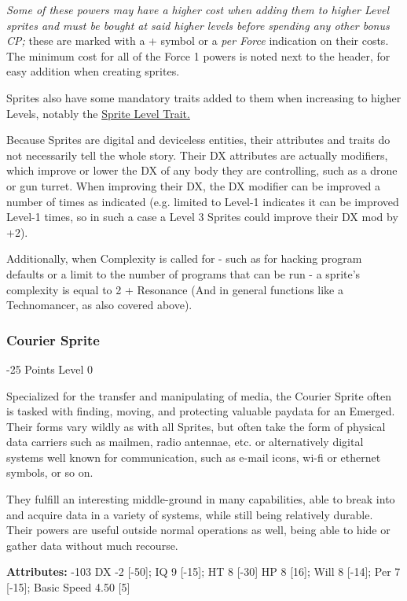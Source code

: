 \begin{multicols*}{3}
\textit{Some of these powers may have a higher cost when adding them to higher Level sprites and must be bought at said higher levels before spending any other bonus CP;} these are marked with a + symbol or a \textit{per Force} indication on their costs. The minimum cost for all of the Force 1 powers is noted next to the header, for easy addition when creating sprites.

Sprites also have some mandatory traits added to them when increasing to higher Levels, notably the \hyperref[sprite_level]{Sprite Level Trait.}

Because Sprites are digital and deviceless entities, their attributes and traits do not necessarily tell the whole story. Their DX attributes are actually modifiers, which improve or lower the DX of any body they are controlling, such as a drone or gun turret. When improving their DX, the DX modifier can be improved a number of times as indicated (e.g. limited to Level-1 indicates it can be improved Level-1 times, so in such a case a Level 3 Sprites could improve their DX mod by +2).

Additionally, when Complexity is called for - such as for hacking program defaults or a limit to the number of programs that can be run - a sprite's complexity is equal to 2 + Resonance (And in general functions like a Technomancer, as also covered above).

\subsubsection{Courier Sprite}
\begin{flushright}
	 -25 Points Level 0
\end{flushright}

Specialized for the transfer and manipulating of media, the Courier Sprite often is tasked with finding, moving, and protecting valuable paydata for an Emerged. Their forms vary wildly as with all Sprites, but often take the form of physical data carriers such as mailmen, radio antennae, etc. or alternatively digital systems well known for communication, such as e-mail icons, wi-fi or ethernet symbols, or so on.

They fulfill an interesting middle-ground in many capabilities, able to break into and acquire data in a variety of systems, while still being relatively durable. Their powers are useful outside normal operations as well, being able to hide or gather data without much recourse.

\textbf{Attributes:} -103
DX -2 [-50]; IQ 9 [-15]; HT 8 [-30]
HP 8 [16]; Will 8 [-14]; Per 7 [-15]; Basic Speed 4.50 [5]


\end{multicols*}
